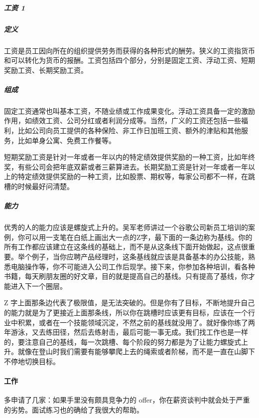 \documentclass[letterpaper,10pt,english]{sphinxmanual}
\begin{document}
\subparagraph{工资 1\sphinxfootnotemark[897]}
\label{\detokenize{chapter_interview/reward:id2}}%
\begin{footnotetext}[897]\sphinxAtStartFootnote
{}
%
\end{footnotetext}\ignorespaces 

\subparagraph{定义}
\label{\detokenize{chapter_interview/reward:id3}}
工资是员工因向所在的组织提供劳务而获得的各种形式的酬劳。狭义的工资指货币和可以转化为货币的报酬。工资包括四个部分，分别是固定工资、浮动工资、短期奖励工资、长期奖励工资。


\subparagraph{组成}
\label{\detokenize{chapter_interview/reward:id4}}
固定工资通常也叫基本工资，不随业绩或工作成果变化。浮动工资具备一定的激励作用，如绩效工资、公司分红或者利润分成等。当然，广义的工资还包括一些福利，比如公司向员工提供的各种保险、非工作日加班工资、额外的津贴和其他服务，比如单身公寓、免费工作餐等。

短期奖励工资是针对一年或者一年以内的特定绩效提供奖励的一种工资，比如年终奖，有些公司会把年底双薪或者三薪算进去。长期奖励工资是针对一年或者一年以上的特定绩效提供奖励的一种工资，比如股票、期权等，每家公司都不一样，在跳槽的时候最好问清楚。


\subparagraph{能力}
\label{\detokenize{chapter_interview/reward:id5}}
优秀的人的能力应该是螺旋式上升的。吴军老师讲过一个谷歌公司新员工培训的案例，你可以用一支笔在白纸上画出大一点的Z字，最下面的一条边称为基线。你的所有工作都应该建立在这条线的基础上，而不是从这条线下面开始做起，这点很重要。举个例子，当你应聘产品经理时，这条基线就应该是具备基本的办公技能，熟悉电脑操作等，你不可能进入公司工作后现学。接下来，你参加各种培训，看各种书籍，每天刷朋友圈的好文章，目的就是提高自己的基线。只有提高了基线，你才能进入下一个圈层。

Z
字上面那条边代表了极限值，是无法突破的。但是你有了目标，不断地提升自己的能力就是为了更接近上面那条线，所以你在跳槽时应该更有目标，应该在一个行业中积累，或者在一个技能领域沉淀，不然之前的基线就没用了。就好像你练了两年游泳，又去练田径，然后去练射击，最后可能一事无成。我们找工作也是一样的，要注意自己的基线，每一次跳槽、每个阶段的努力都是为了让能力螺旋式上升。就像在登山时我们需要有能够攀爬上去的绳索或者阶梯，而不是一直在山脚下不停地切换目标。


\paragraph{工作}
\label{\detokenize{chapter_interview/offer:id1}}\label{\detokenize{chapter_interview/offer::doc}}
多申请了几家：如果手里没有颇具竞争力的
offer，你在薪资谈判中就会处于严重的劣势。面试练习也的确给了我很大的帮助。
\end{document}
